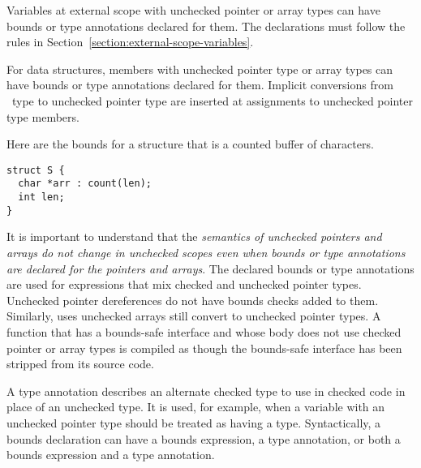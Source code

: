Variables at external scope with unchecked pointer or array types
can have bounds or type annotations declared for them.
The declarations must follow the
rules in Section~\ref{section:external-scope-variables}.

For data structures, members with unchecked pointer type or array types
can have bounds or type annotations declared for them.   Implicit conversions from
\arrayptr\ type to unchecked pointer type are inserted at assignments to unchecked
pointer type members.

%

Here are the bounds for a structure that is a counted buffer of
characters.
\begin{lstlisting}
struct S {
  char *arr : count(len);
  int len;
}
\end{lstlisting}

It is important to understand that the \emph{semantics of unchecked
pointers and arrays do not change in unchecked scopes even when bounds
or type annotations are declared for the pointers and arrays}. The declared bounds
or type annotations are used for expressions
that mix checked and unchecked pointer types. Unchecked pointer dereferences do not
have bounds checks added to them.  Similarly, uses unchecked arrays still convert to
unchecked pointer types.   A function that has a bounds-safe
interface and whose body does not use checked pointer or array
types is compiled as though the bounds-safe interface has been
stripped from its source code.

A type annotation describes an alternate checked type to use in checked code
in place of an unchecked type. It is used, for example, when a variable with
an unchecked pointer type should be treated as having
a  type.  Syntactically, a bounds declaration can have
a bounds expression, a type annotation, or both a bounds expression
and a type annotation.

